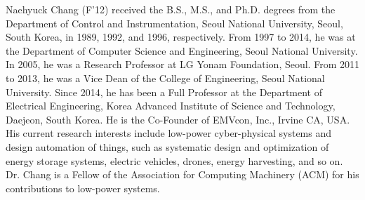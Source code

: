 \documentclass[journal]{./template/IEEEtran}
\begin{document}
\begin{IEEEbiography}{Naehyuck Chang}
(F’12) received the B.S., M.S., and Ph.D. degrees from the Department of Control and Instrumentation, Seoul National University, Seoul, South Korea, in 1989, 1992, and 1996, respectively.
From 1997 to 2014, he was at the Department of Computer Science and Engineering, Seoul National University. In 2005, he was a Research Professor at LG Yonam Foundation, Seoul. From 2011 to 2013, he was a Vice Dean of the College of Engineering, Seoul National University. Since 2014, he has been
a Full Professor at the Department of Electrical Engineering, Korea Advanced Institute of Science and Technology, Daejeon, South Korea. He is the Co-Founder of EMVcon, Inc., Irvine CA, USA. His current research interests include low-power cyber-physical systems and design automation of things, such as systematic design and optimization of energy storage systems, electric vehicles, drones, energy harvesting, and so on.
Dr. Chang is a Fellow of the Association for Computing Machinery (ACM) for his contributions to low-power systems. 

\end{IEEEbiography}
\end{document}

